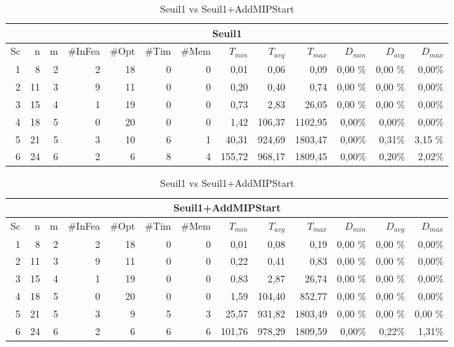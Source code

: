\begin{table}[h]
    \centering
    \begin{tabular}{|r|r|r|r|r|r|r|r|r|r|r|r|r|}
    	\hline
    	\multicolumn{13}{|c|}{Seuil1}\\ \hline
Sc &n	&m	&\#InFea	&\#Opt	&\#Tim &\#Mem	&$T_{min}$ & $T_{avg}$	& $T_{max}$ & $D_{min}$ & $D_{avg}$	& $D_{max}$ \\ \hline
1&	8 &	2&	2	&18	&0	&0 &0,01	&0,06	&0,09	&0,00	\%&0,00	\%&0,00\%    \\ \hline
2&	11&	3&	9	&11	&0	&0 &0,20	&0,40	&0,74	&0,00	\%&0,00	\%&0,00\%     \\ \hline
3&	15&	4&	1	&19	&0	&0 &0,73	&2,83	&26,05	&0,00	\%&0,00	\%&0,00\%    \\ \hline
4 &	18	&5&	0	&20	&0	&0 &1,42	&106,37	&1102,95&	0,00\%&	0,00\%&	0,00\%     \\ \hline
5 &	21	&5&	3	&10	&6	&1 &40,31	&924,69	&1803,47&	0,00\%&	0,31\%&	3,15    \%    \\ \hline
6 &	24	&6	&2	&6	&8	&4 &155,72	&968,17	&1809,45&	0,00\%&	0,20\%&	2,02\%     \\ \hline
    \end{tabular}
\medskip \par
    \begin{tabular}{|r|r|r|r|r|r|r|r|r|r|r|r|r|}
    	\hline
    	\multicolumn{13}{|c|}{Seuil1+AddMIPStart}\\ \hline
Sc &n	&m	&\#InFea	&\#Opt	&\#Tim &\#Mem	&$T_{min}$ & $T_{avg}$	& $T_{max}$ & $D_{min}$ & $D_{avg}$	& $D_{max}$ \\ \hline
1&	8 &	2&	2		&18&	0&	0       & 0,01	&0,08	&0,19	&0,00	\%&0,00	\%&0,00\%    \\ \hline
2&	11&	3&	9		&11&	0&	0       & 0,22	&0,41	&0,83	&0,00	\%&0,00	\%&0,00\%     \\ \hline
3&	15&	4&	1		&19&	0&	0       & 0,83	&2,87	&26,74	&0,00	\%&0,00	\%&0,00\%    \\ \hline
4 &	18	&5&	0		&20&	0&	0       & 1,59	&104,40	&852,77	&0,00	\%&0,00	\%&0,00\%     \\ \hline
5 &	21	&5&	3		&9		&5	&3& 25,57	&931,82	&1803,49	&0,00	\%&0,00	\%&0,00   \%    \\ \hline
6 &	24	&6	&2		&6		&6	&6& 101,76	&978,29	&1809,59	&0,00\%&	0,22\%&	1,31\%     \\ \hline
    \end{tabular}
    \caption{Seuil1 vs Seuil1+AddMIPStart}
    \label{tab_cut2_ams1_tab2}
\end{table}


